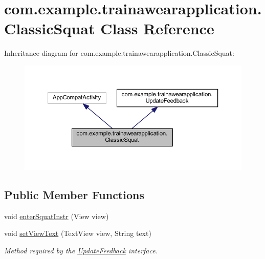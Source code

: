 \hypertarget{classcom_1_1example_1_1trainawearapplication_1_1_classic_squat}{}\section{com.\+example.\+trainawearapplication.\+Classic\+Squat Class Reference}
\label{classcom_1_1example_1_1trainawearapplication_1_1_classic_squat}


Inheritance diagram for com.\+example.\+trainawearapplication.\+Classic\+Squat\+:
\nopagebreak
\begin{figure}[H]
\begin{center}
\leavevmode
\includegraphics[width=350pt]{classcom_1_1example_1_1trainawearapplication_1_1_classic_squat__inherit__graph}
\end{center}
\end{figure}
\subsection*{Public Member Functions}
\begin{DoxyCompactItemize}
\item 
void \mbox{\hyperlink{classcom_1_1example_1_1trainawearapplication_1_1_classic_squat_af11bf43a5c57edf97320d8662fc343a1}{enter\+Squat\+Instr}} (View view)
\item 
void \mbox{\hyperlink{classcom_1_1example_1_1trainawearapplication_1_1_classic_squat_ab193e39e2f1255fd88d0508cfe7a63ff}{set\+View\+Text}} (Text\+View view, String text)
\begin{DoxyCompactList}\small\item\em Method required by the \mbox{\hyperlink{interfacecom_1_1example_1_1trainawearapplication_1_1_update_feedback}{Update\+Feedback}} interface. \end{DoxyCompactList}\end{DoxyCompactItemize}
